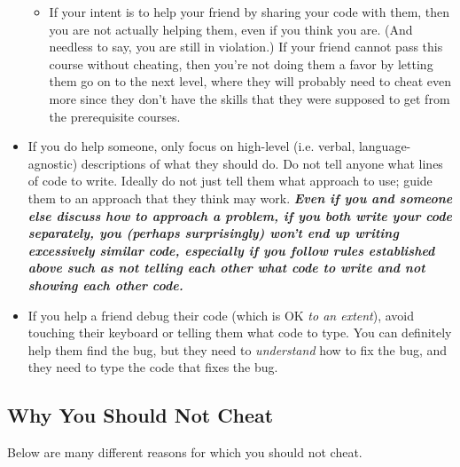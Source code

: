 \documentclass{article}
\begin{document}
\begin{itemize}[itemsep=0mm, parsep=0pt]
\begin{itemize}[itemsep=0mm, parsep=0pt]
\begin{itemize}[itemsep=0mm, parsep=0pt]
        \end{itemize}
    \item If your intent is to help your friend by sharing your code with them, then you are not actually helping them, even if you think you are. (And needless to say, you are still in violation.) If your friend cannot pass this course without cheating, then you're not doing them a favor by letting them go on to the next level, where they will probably need to cheat even more since they don't have the skills that they were supposed to get from the prerequisite courses.
    \end{itemize}
\item If you do help someone, only focus on high-level (i.e. verbal, language-agnostic) descriptions of what they should do. Do not tell anyone what lines of code to write. Ideally do not just tell them what approach to use; guide them to an approach that they think may work. \textbf{\textit{Even if you and someone else discuss how to approach a problem, if you both write your code separately, you (perhaps surprisingly) won't end up writing excessively similar code, especially if you follow rules established above such as not telling each other what code to write and not showing each other code.}}
\item If you help a friend debug their code (which is OK \textit{to an extent}), avoid touching their keyboard or telling them what code to type. You can definitely help them find the bug, but they need to \textit{understand} how to fix the bug, and they need to type the code that fixes the bug.
\end{itemize}

\subsection{Why You Should Not Cheat}

Below are many different reasons for which you should not cheat.
\end{document}
